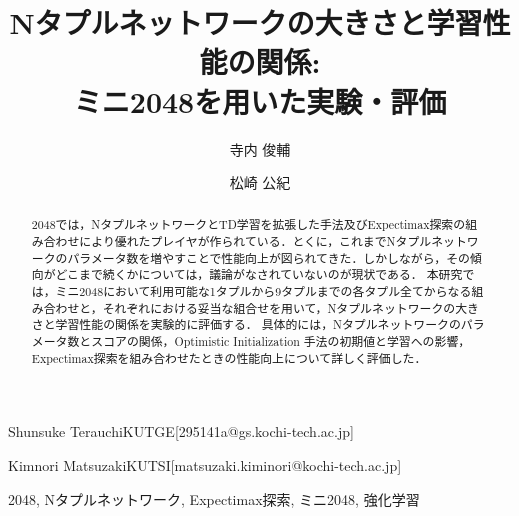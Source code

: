 \documentclass[techrep,submit,noauthor,platex,dvipdfmx]{ipsj}
\begin{document}
\title{Nタプルネットワークの大きさと学習性能の関係:\\ミニ2048を用いた実験・評価}






\author{寺内 俊輔}{Shunsuke Terauchi}{KUTGE}[295141a@gs.kochi-tech.ac.jp]
\author{松崎 公紀}{Kimnori Matsuzaki}{KUTSI}[matsuzaki.kiminori@kochi-tech.ac.jp]

\begin{abstract}
    2048では，NタプルネットワークとTD学習を拡張した手法及びExpectimax探索の組み合わせにより優れたプレイヤが作られている．とくに，これまでNタプルネットワークのパラメータ数を増やすことで性能向上が図られてきた．しかしながら，その傾向がどこまで続くかについては，議論がなされていないのが現状である．
    本研究では，ミニ2048において利用可能な1タプルから9タプルまでの各タプル全てからなる組み合わせと，それぞれにおける妥当な組合せを用いて，Nタプルネットワークの大きさと学習性能の関係を実験的に評価する．
    具体的には，Nタプルネットワークのパラメータ数とスコアの関係，Optimistic Initialization 手法の初期値と学習への影響，Expectimax探索を組み合わせたときの性能向上について詳しく評価した．
\end{abstract}

\begin{jkeyword}
2048, Nタプルネットワーク, Expectimax探索, ミニ2048, 強化学習
\end{jkeyword}


\maketitle






\end{document}
